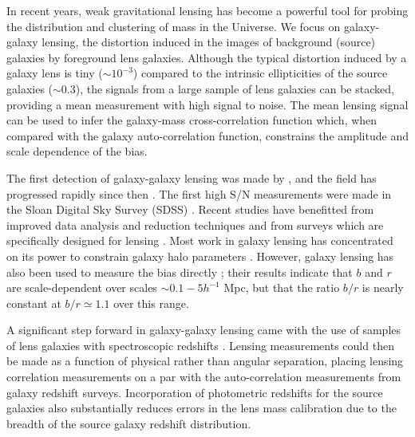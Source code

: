 \documentclass{emulateapj}
\begin{document}
In recent years, weak gravitational lensing has become a powerful tool 
for probing the distribution and clustering of mass in the Universe. We focus on 
galaxy-galaxy lensing, the distortion induced in the images of background (source) 
galaxies by foreground lens galaxies. Although the typical distortion induced by a 
galaxy lens is tiny ($\sim 10^{-3}$) 
compared to the intrinsic ellipticities of the source 
galaxies ($\sim 0.3$), the signals from a large sample of lens galaxies can be 
stacked, providing a mean measurement with high signal to noise.  
The mean lensing signal can be used to infer the galaxy-mass cross-correlation 
function which, when compared with 
the galaxy auto-correlation function, constrains the amplitude and 
scale dependence of the bias. 

The first detection of galaxy-galaxy lensing was made by \citet{Brainerd96},  
and the field has progressed rapidly since then 
\citep{Dell96,Griffiths96,Hudson98,fis00,Wilson01,Smith01,Mckay02,Hoekstra03a}.
The first high S/N measurements were made in the Sloan Digital Sky Survey
(SDSS) \citep{fis00}.  Recent studies have benefitted from improved data 
analysis and reduction techniques 
and from surveys which are specifically designed for lensing \citep{Hoekstra01b}.
Most work in galaxy lensing has concentrated on its power to constrain galaxy
halo parameters \citep{Brainerd96,Hudson98,fis00,Hoekstra03a}.  However, galaxy 
lensing has also been
used to measure the bias directly \citep{Hoekstra01b,Hoekstra02b}; 
their results indicate that $b$ and $r$ are scale-dependent over 
scales $\sim 0.1-5 h^{-1}$ Mpc, but that the ratio $b/r$ is nearly 
constant at $b/r \simeq 1.1$ over this range. 

A significant step forward in galaxy-galaxy lensing came with the use of samples of 
lens galaxies with spectroscopic 
redshifts \citep{Smith01,Mckay02}.  Lensing measurements could then be 
made as a function of physical rather than angular separation, placing
lensing correlation measurements on a par with the auto-correlation measurements
from galaxy redshift surveys. Incorporation of photometric redshifts 
for the source galaxies \citep{Hudson98} also substantially reduces errors 
in the lens mass calibration due to  
the breadth of the source galaxy redshift distribution. 
\end{document}
